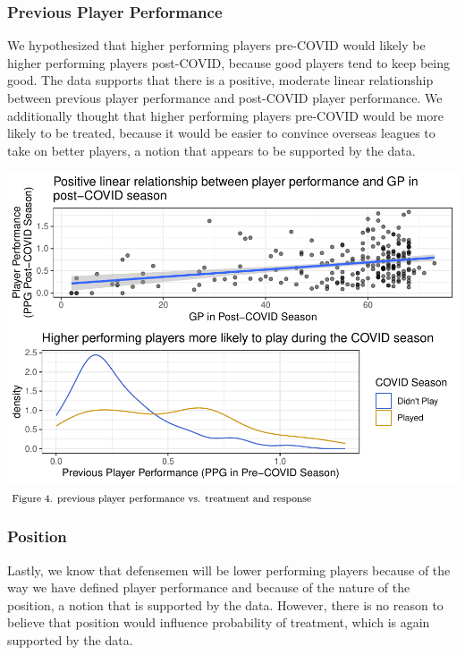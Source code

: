 \documentclass[12pt]{article}
\begin{document}
\hypertarget{previous-player-performance}{%
\subsubsection{Previous Player
Performance}\label{previous-player-performance}}

We hypothesized that higher performing players pre-COVID would likely be
higher performing players post-COVID, because good players tend to keep
being good. The data supports that there is a positive, moderate linear
relationship between previous player performance and post-COVID player
performance. We additionally thought that higher performing players
pre-COVID would be more likely to be treated, because it would be easier
to convince overseas leagues to take on better players, a notion that
appears to be supported by the data.

\includegraphics{journal-article-nb_files/figure-latex/ppp-plots-1.pdf}
\(\hspace*{\fill} \footnotesize \text{Figure 4. previous player performance vs. treatment and response}\)

\hypertarget{position}{%
\subsubsection{Position}\label{position}}

Lastly, we know that defensemen will be lower performing players because
of the way we have defined player performance and because of the nature
of the position, a notion that is supported by the data. However, there
is no reason to believe that position would influence probability of
treatment, which is again supported by the data.
\end{document}
